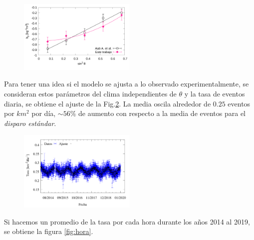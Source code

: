 \begin{figure}[H]
    \begin{small}
        \begin{center}
            \includegraphics[width=0.5\textwidth]{brho.pdf}
        \end{center}
        \caption{}
        \label{fig:}
    \end{small}
\end{figure}


Para tener una idea si el modelo se ajusta a  lo observado experimentalmente, se consideran estos parámetros del clima independientes de $\theta$ y la tasa de eventos diaria, se obtiene el ajuste de la Fig.\ref{fig:tasa}. La media oscila alrededor  de $0.25$ eventos por $km^2$ por día, $\sim 56\%$ de aumento con respecto a la  media de eventos para el \emph{disparo estándar}.


\begin{figure}[H]
    \begin{small}
        \begin{center}
            \includegraphics[width=0.5\textwidth]{rate_daily.pdf}
        \end{center}
        \caption{}
        \label{fig:tasa}
    \end{small}
\end{figure}

Si hacemos un promedio de la tasa por cada hora durante los años 2014 al 2019, se obtiene la figura \ref{fig:hora}.


